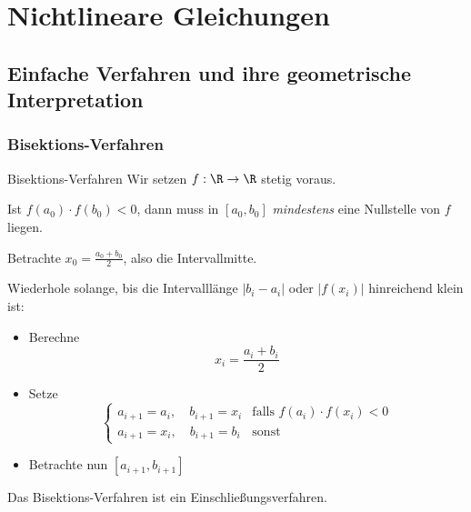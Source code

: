 \section{Nichtlineare Gleichungen}


\subsection{Einfache Verfahren und ihre geometrische Interpretation}
\subsubsection{Bisektions-Verfahren}


\begin{defi}{Bisektions-Verfahren}
    Wir setzen $f: \R \to \R$ stetig voraus.
    
    Ist $f(a_0) \cdot f(b_0) < 0$, dann muss in $[a_0, b_0]$ \emph{mindestens} eine Nullstelle von $f$ liegen.
    
    Betrachte $x_0 = \frac{a_0 + b_0}{2}$, also die Intervallmitte.
    
    Wiederhole solange, bis die Intervalllänge $|b_i - a_i|$ oder $|f(x_i)|$ hinreichend klein ist:
    \begin{itemize}
        \item Berechne
              \[
                  x_{i} = \frac{a_i + b_i}{2}
              \]
        \item Setze
              \[
                  \begin{cases}
                      a_{i+1} = a_{i}, \quad b_{i+1} = x_{i} & \text{falls } f(a_{i}) \cdot f(x_{i}) < 0 \\
                      a_{i+1} = x_{i}, \quad b_{i+1} = b_{i} & \text{sonst}
                  \end{cases}
              \]
        \item Betrachte nun $[a_{i+1}, b_{i+1}]$
    \end{itemize}
    
    Das Bisektions-Verfahren ist ein Einschließungsverfahren.
\end{defi}

